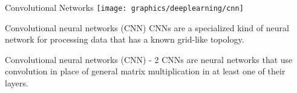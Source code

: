     \begin{frame}{Convolutional Networks}
        \vskip 0.5cm
        \texttt{[image: graphics/deeplearning/cnn]}
        \begin{description}
            \item<1-> \vskip -0.5cm
                \begin{block}{Convolutional neural networks (CNN)}
                    CNNs are a specialized kind of neural network for processing data that has a known grid-like topology.
                \end{block}
            \item<2-> \vskip -0.7cm
                \begin{block}{Convolutional neural networks (CNN) - 2}
                    CNNs are neural networks that use convolution in place of general matrix multiplication in at least one of their layers.
                \end{block}
        \end{description}
    \end{frame}
